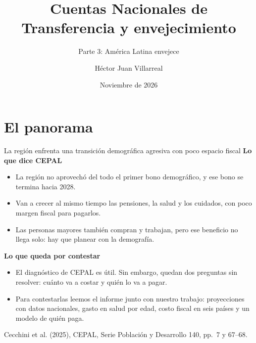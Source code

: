 \documentclass[aspectratio=169,11pt]{beamer}
\title{Cuentas Nacionales de Transferencia y envejecimiento}
\subtitle{Parte 3: América Latina envejece}
\author{Héctor Juan Villarreal}
\institute{Finanzas Públicas · Maestría en Economía Aplicada\\Escuela de Gobierno y Transformación Pública · Tec de Monterrey}
\date{Noviembre de 2026}
\newcommand{\fuente}[1]{\par\vfill{\small\color{cGris}#1\par}}
\begin{document}
\section{El panorama}

\begin{frame}[plain]
  \titlepage
\end{frame}

\begin{frame}{La región enfrenta una transición demográfica agresiva con poco espacio fiscal}
  \textbf{Lo que dice CEPAL}
  \begin{itemize}
    \item La región no aprovechó del todo el primer bono demográfico, y ese bono se termina hacia 2028.
    \item Van a crecer al mismo tiempo las pensiones, la salud y los cuidados, con poco margen fiscal para pagarlos.
    \item Las personas mayores también compran y trabajan, pero ese beneficio no llega solo: hay que planear con la demografía.
  \end{itemize}
  \pause
  \medskip
  \textbf{Lo que queda por contestar}
  \begin{itemize}
    \item El diagnóstico de CEPAL es útil. Sin embargo, quedan dos preguntas sin resolver: cuánto va a costar y quién lo va a pagar.
    \item Para contestarlas leemos el informe junto con nuestro trabajo: proyecciones con datos nacionales, gasto en salud por edad, costo fiscal en seis países y un modelo de quién paga.
  \end{itemize}
  \fuente{Cecchini et al. (2025), CEPAL, Serie Población y Desarrollo 140, pp.~7 y 67--68.}
\end{frame}
\end{document}
